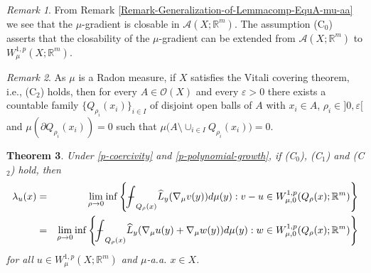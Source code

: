 \documentclass[10pt]{amsart}
\numberwithin{equation}{section}
\newtheorem{theorem}{Theorem}[section]
\theoremstyle{definition}
\theoremstyle{remark}
\newtheorem{remark}[theorem]{Remark}
\begin{document}
\begin{remark}
From Remark \ref{Remark-Generalization-of-Lemmacomp-EquA-mu-aa} we see that the $\mu$-gradient is closable in $\mathcal{A}(X;{{\mathbb R}}^m)$. The assumption (C$_0$) asserts that the closability of the $\mu$-gradient can be extended from $\mathcal{A}(X;{{\mathbb R}}^m)$ to $W^{1,p}_\mu(X;{{\mathbb R}}^m)$. 
\end{remark}

\begin{remark}\label{ReMArK-VItALi-For-OpEN-SEtS}
As $\mu$ is a Radon measure, if $X$ satisfies the Vitali covering theorem, i.e., (C$_2$) holds, then for every $A\in\mathcal{O}(X)$ and every ${\varepsilon}>0$ there exists a countable family $\{Q_{\rho_i}(x_i)\}_{i\in I}$ of disjoint open balls of $A$ with $x_i\in A$, $\rho_i\in]0,{\varepsilon}[$ and $\mu(\partial Q_{\rho_i}(x_i))=0$ such that $\mu\big(A\setminus\cup_{i\in I}Q_{\rho_i}(x_i)\big)=0$.
\end{remark}

\begin{theorem}\label{IR-Theorem}
Under \eqref{p-coercivity} and \eqref{p-polynomial-growth}, if {\rm (C$_0$)}, {\rm (C$_1$)} and {\rm (C$_2$)} hold, then 
\begin{eqnarray*}
\lambda_u(x)&=&\lim_{\rho\to 0}\inf\left\{{{{\bf-}\!\!\!\!\!\!\hspace{-.1em}\int}}_{Q_\rho(x)}\widehat{L}_y(\nabla_\mu v(y))d\mu(y):v-u\in W^{1,p}_{\mu,0}(Q_\rho(x);{{\mathbb R}}^m)\right\}\\
&=&\lim_{\rho\to 0}\inf\left\{{{{\bf-}\!\!\!\!\!\!\hspace{-.1em}\int}}_{Q_\rho(x)}\widehat{L}_y(\nabla_\mu u(y)+\nabla_\mu w(y))d\mu(y):w\in W^{1,p}_{\mu,0}(Q_\rho(x);{{\mathbb R}}^m)\right\}
\end{eqnarray*}
for all $u\in W^{1,p}_\mu(X;{{\mathbb R}}^m)$ and $\mu$-a.a. $x\in X$. 
\end{theorem}
\end{document}
